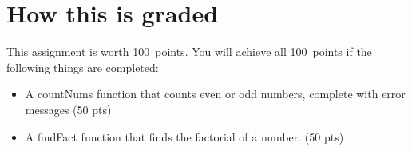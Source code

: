 \documentclass{article}
\newcommand{\AValue}{100}
\begin{document}
\section*{How this is graded}
This assignment is worth \AValue \ points. You will achieve all \AValue \   points if the following things are completed:
\begin{itemize}
    \item A countNums function that counts even or odd numbers, complete with error messages (50 pts)
    \item A findFact function that finds the factorial of a number. (50 pts)
\end{itemize}
\end{document}
